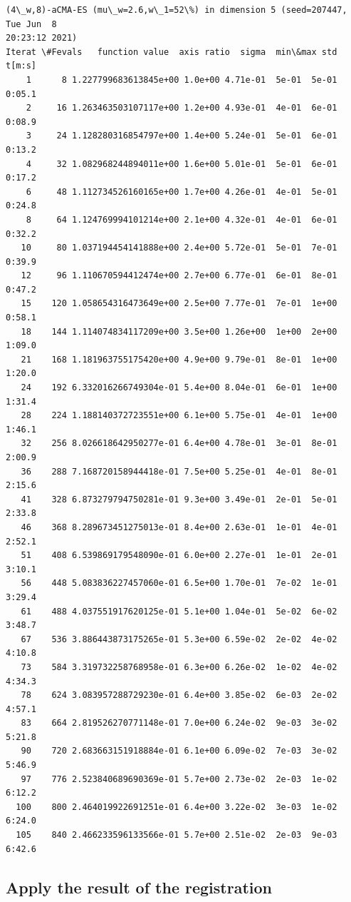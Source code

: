 \documentclass[11pt]{article}
\begin{document}
    \begin{Verbatim}[commandchars=\\\{\}]
(4\_w,8)-aCMA-ES (mu\_w=2.6,w\_1=52\%) in dimension 5 (seed=207447, Tue Jun  8
20:23:12 2021)
Iterat \#Fevals   function value  axis ratio  sigma  min\&max std  t[m:s]
    1      8 1.227799683613845e+00 1.0e+00 4.71e-01  5e-01  5e-01 0:05.1
    2     16 1.263463503107117e+00 1.2e+00 4.93e-01  4e-01  6e-01 0:08.9
    3     24 1.128280316854797e+00 1.4e+00 5.24e-01  5e-01  6e-01 0:13.2
    4     32 1.082968244894011e+00 1.6e+00 5.01e-01  5e-01  6e-01 0:17.2
    6     48 1.112734526160165e+00 1.7e+00 4.26e-01  4e-01  5e-01 0:24.8
    8     64 1.124769994101214e+00 2.1e+00 4.32e-01  4e-01  6e-01 0:32.2
   10     80 1.037194454141888e+00 2.4e+00 5.72e-01  5e-01  7e-01 0:39.9
   12     96 1.110670594412474e+00 2.7e+00 6.77e-01  6e-01  8e-01 0:47.2
   15    120 1.058654316473649e+00 2.5e+00 7.77e-01  7e-01  1e+00 0:58.1
   18    144 1.114074834117209e+00 3.5e+00 1.26e+00  1e+00  2e+00 1:09.0
   21    168 1.181963755175420e+00 4.9e+00 9.79e-01  8e-01  1e+00 1:20.0
   24    192 6.332016266749304e-01 5.4e+00 8.04e-01  6e-01  1e+00 1:31.4
   28    224 1.188140372723551e+00 6.1e+00 5.75e-01  4e-01  1e+00 1:46.1
   32    256 8.026618642950277e-01 6.4e+00 4.78e-01  3e-01  8e-01 2:00.9
   36    288 7.168720158944418e-01 7.5e+00 5.25e-01  4e-01  8e-01 2:15.6
   41    328 6.873279794750281e-01 9.3e+00 3.49e-01  2e-01  5e-01 2:33.8
   46    368 8.289673451275013e-01 8.4e+00 2.63e-01  1e-01  4e-01 2:52.1
   51    408 6.539869179548090e-01 6.0e+00 2.27e-01  1e-01  2e-01 3:10.1
   56    448 5.083836227457060e-01 6.5e+00 1.70e-01  7e-02  1e-01 3:29.4
   61    488 4.037551917620125e-01 5.1e+00 1.04e-01  5e-02  6e-02 3:48.7
   67    536 3.886443873175265e-01 5.3e+00 6.59e-02  2e-02  4e-02 4:10.8
   73    584 3.319732258768958e-01 6.3e+00 6.26e-02  1e-02  4e-02 4:34.3
   78    624 3.083957288729230e-01 6.4e+00 3.85e-02  6e-03  2e-02 4:57.1
   83    664 2.819526270771148e-01 7.0e+00 6.24e-02  9e-03  3e-02 5:21.8
   90    720 2.683663151918884e-01 6.1e+00 6.09e-02  7e-03  3e-02 5:46.9
   97    776 2.523840689690369e-01 5.7e+00 2.73e-02  2e-03  1e-02 6:12.2
  100    800 2.464019922691251e-01 6.4e+00 3.22e-02  3e-03  1e-02 6:24.0
  105    840 2.466233596133566e-01 5.7e+00 2.51e-02  2e-03  9e-03 6:42.6
    \end{Verbatim}

    \hypertarget{apply-the-result-of-the-registration}{%
\subsection{Apply the result of the
registration}\label{apply-the-result-of-the-registration}}
\end{document}
